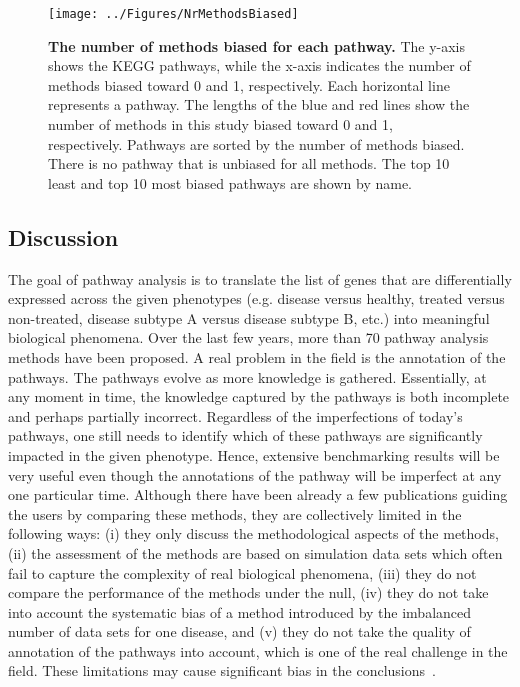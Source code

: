 \begin{figure}[h]
	\texttt{[image: ../Figures/NrMethodsBiased]}

        \caption{\textbf{The number of methods biased for each pathway.} The y-axis shows the KEGG pathways, while the x-axis indicates the number of methods biased toward 0 and  1, respectively. Each horizontal line represents a pathway. The lengths of the blue and red lines show the number of methods in this study biased toward 0 and 1, respectively. Pathways are sorted by the number of methods biased. There is no pathway that is unbiased for all methods. The top 10 least and top 10 most biased pathways are shown by name.}\label{fig:PathwaysDist}
\end{figure}

\subsection{Discussion}
The goal of pathway analysis is to translate the list of genes that are differentially expressed across the given phenotypes (e.g. disease versus healthy, treated versus non-treated, disease subtype A versus disease subtype B, etc.) into meaningful biological phenomena.
Over the last few years, more than 70 pathway analysis methods have been proposed.
A real problem in the field is the annotation of the pathways. The pathways evolve as more knowledge is gathered. Essentially, at any moment in time, the knowledge captured by the pathways is both incomplete and perhaps partially incorrect. Regardless of the imperfections of today's pathways, one still needs to identify which of these pathways  are significantly impacted in the given phenotype. Hence, extensive benchmarking results will be very useful even though the annotations of the pathway will be imperfect at any one particular time. 
Although there have been already a few publications guiding the users by comparing these methods, they are collectively limited in the following ways: (i) they only discuss the methodological aspects of the methods, (ii) the assessment of the methods are based on simulation data sets which often fail to capture the complexity of real biological phenomena, (iii) they do not compare the performance of the methods under the null, (iv) they do not take into account the systematic bias of a method introduced by the imbalanced number of data sets for one disease, and (v) they do not take the quality of annotation of the pathways into account, which is one of the real challenge in the field.
These limitations may cause significant bias in the conclusions~\cite{nguyen2018network}.
